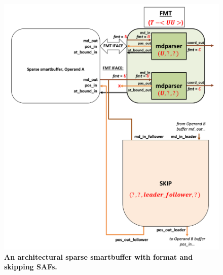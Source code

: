 \begin{figure}[ht]
\includegraphics[width=\textwidth]{figures/safinference_build_05mdparserfmtattr.png}
\caption{\textbf{An architectural sparse smartbuffer with format and skipping SAFs.}}
\label{fig:safinference_build_05mdparserfmtattr}
\centering
\end{figure}



